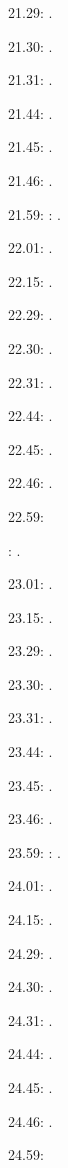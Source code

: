 \documentclass[italian]{article}
\begin{document}
21.29:     . 

21.30:     .

21.31:     .

21.44:     .

21.45:     .

21.46:     .

21.59:     
:    .

22.01:     . 

22.15:     . 

22.29:     . 

22.30:     .

22.31:     .

22.44:     .

22.45:     .

22.46:     .

22.59:     

:    .

23.01:     . 

23.15:     . 

23.29:     . 

23.30:     .

23.31:     .

23.44:     .

23.45:     .

23.46:     .

23.59:     
:    .

24.01:     . 

24.15:     . 

24.29:     . 

24.30:     .

24.31:     .

24.44:     .

24.45:     .

24.46:     .

24.59:     
\end{document}

